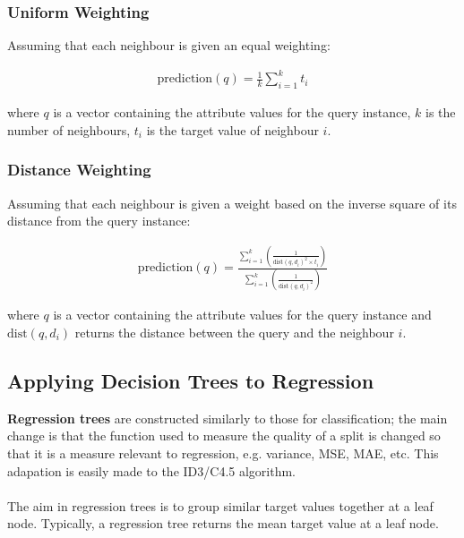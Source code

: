 \documentclass[a4paper,11pt]{article}
\begin{document}
\subsubsection{Uniform Weighting}
Assuming that each neighbour is given an equal weighting:

\begin{align*}
    \text{prediction}(q) = \frac{1}{k} \sum^k_{i=1} t_i
\end{align*}

where $q$ is a vector containing the attribute values for the query instance, $k$ is the number of neighbours, $t_i$ is the target value of neighbour $i$.

\subsubsection{Distance Weighting}
Assuming that each neighbour is given a weight based on the inverse square of its distance from the query instance:

\begin{align*}
    \text{prediction}(q) = \frac{ \sum^k_{i=1} \left( \frac{1}{ \text{dist}(q, d_i)^2  \times t_i } \right) }{ \sum^k_{i=1} \left( \frac{1}{\text{dist}(q, d_i)^2  } \right) }
\end{align*}

where $q$ is a vector containing the attribute values for the query instance and $\text{dist}(q,d_i)$ returns the distance between the query and the neighbour $i$.

\subsection{Applying Decision Trees to Regression}
\textbf{Regression trees} are constructed similarly to those for classification;
the main change is that the function used to measure the quality of a split is changed so that it is a measure relevant to regression, e.g. variance, MSE, MAE, etc.
This adapation is easily made to the ID3/C4.5 algorithm.
\\\\
The aim in regression trees is to group similar target values together at a leaf node.
Typically, a regression tree returns the mean target value at a leaf node.
\end{document}
